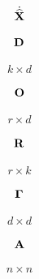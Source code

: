 \documentclass[12 pt]{article}
\begin{document}
\begin{align*}
    \dot{\widehat{\mathbf{X}}}
\end{align*}

\begin{align*}
    \mathbf{D}
\end{align*}

\begin{align*}
    k \times d
\end{align*}

\begin{align*}
    \mathbf{O}
\end{align*}

\begin{align*}
    r \times d
\end{align*}

\begin{align*}
    \mathbf{R}
\end{align*}

\begin{align*}
    r \times k
\end{align*}

\begin{align*}
    \boldsymbol{\Gamma}
\end{align*}

\begin{align*}
    d \times d
\end{align*}

\begin{align*}
    \mathbf{A}
\end{align*}

\begin{align*}
    n \times n
\end{align*}
\end{document}
